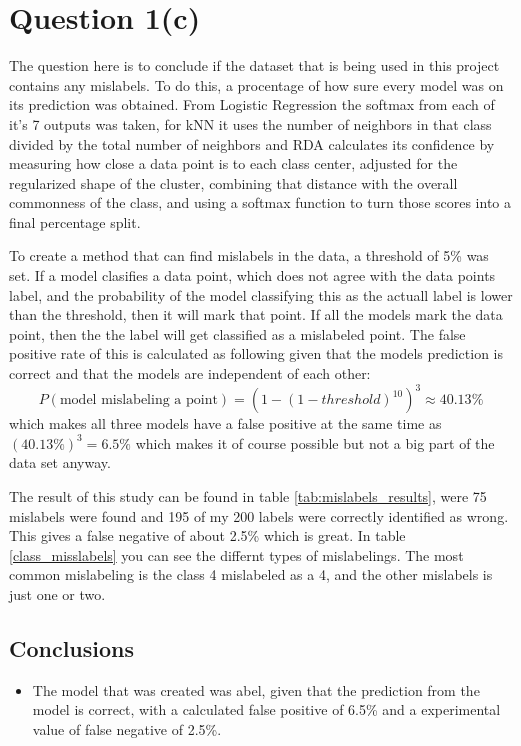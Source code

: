 \documentclass[11pt]{article}
\begin{document}
\section{Question 1(c)}
The question here is to conclude if the dataset that is being used in this project contains any mislabels. To do this, a procentage of how sure every model was on its prediction was obtained. From Logistic Regression the softmax from each of it's 7 outputs was taken, for kNN it uses the number of neighbors in that class divided by the total number of neighbors and RDA calculates its confidence by measuring how close a data point is to each class center, adjusted for the regularized shape of the cluster, combining that distance with the overall commonness of the class, and using a softmax function to turn those scores into a final percentage split.

To create a method that can find mislabels in the data, a threshold of 5\% was set. If a model clasifies a data point, which does not agree with the data points label, and the probability of the model classifying this as the actuall label is lower than the threshold, then it will mark that point. If all the models mark the data point, then the the label will get classified as a mislabeled point. The false positive rate of this is calculated as following given that the models prediction is correct and that the models are independent of each other:
\begin{equation}
	P(\text{model mislabeling a point}) = (1 - (1-threshold)^{10})^3 \approx 40.13\%
	\label{eq:}
\end{equation}
which makes all three models have a false positive at the same time as $(40.13\%)^3 = 6.5\%  $  which makes it of course possible but not a big part of the data set anyway.

The result of this study can be found in table \ref{tab:mislabels_results}, were 75 mislabels were found and 195 of my 200 labels were correctly identified as wrong. This gives a false negative of about 2.5\% which is great. In table \ref{class_misslabels} you can see the differnt types of mislabelings. The most common mislabeling is the class 4 mislabeled as a 4, and the other mislabels is just one or two.


\newpage

\subsection{Conclusions}
\begin{itemize}
	\item The model that was created was abel, given that the prediction from the model is correct, with a calculated false positive of 6.5\% and a experimental value of false negative of 2.5\%.
\end{itemize}
\newpage
\end{document}
